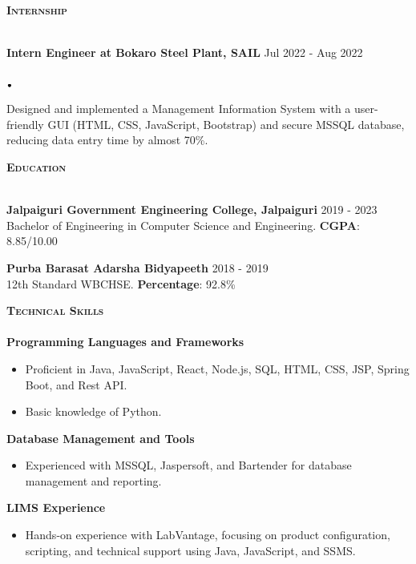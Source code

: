\documentclass[11pt]{article}
\newcommand{\lineunder}{\vspace*{-8pt} \\ \hspace*{-18pt} \hrulefill \\}
\newcommand{\header}[1]{{\hspace*{-15pt}\vspace*{6pt} \textsc{#1}} \vspace*{-6pt} \lineunder}
\newcommand{\lbt}{\,\begin{picture}(-1,1)(-1,-3)\circle*{3}\end{picture}\ }
\newenvironment{achievements}{
    \begin{list}{$\lbt$}{
        \topsep 0pt
        \itemsep 0pt
        \addtolength{\leftmargin}{-0.1in}
    }
}
{
    \vspace*{4pt}
    \end{list}
}
\newcommand{\schoolwithcourses}[3]{
 \textbf{#1} \hfill{#2}\\
    #3\\
\vspace*{5pt}
}
\begin{document}
\header{\textbf{Internship}}
\vspace{1mm}
\schoolwithcourses{Intern Engineer at Bokaro Steel Plant, SAIL}{Jul 2022 - Aug 2022}{}

    \begin{achievements}
    \item{Designed and implemented a Management Information System with a user-friendly GUI (HTML, CSS, JavaScript, Bootstrap) and secure MSSQL database, reducing data entry time by almost 70\%.}
    \end{achievements}


\header{\textbf{Education}}
\vspace{1mm}
\schoolwithcourses{Jalpaiguri Government Engineering College, Jalpaiguri}{2019 - 2023}{Bachelor of Engineering in Computer Science and Engineering. \textbf{CGPA}: 8.85/10.00}

\schoolwithcourses{Purba Barasat Adarsha Bidyapeeth}{2018 - 2019}{12th Standard WBCHSE. \textbf{Percentage}: 92.8\%}

\header{\textbf{Technical Skills}}
\vspace{1mm}
\textbf{Programming Languages and Frameworks}
    \begin{itemize}
        \item Proficient in Java, JavaScript, React, Node.js, SQL, HTML, CSS, JSP, Spring Boot, and Rest API.
        \item Basic knowledge of Python.
    \end{itemize}

\textbf{Database Management and Tools}
    \begin{itemize}
        \item Experienced with MSSQL, Jaspersoft, and Bartender for database management and reporting.
    \end{itemize}

\textbf{LIMS Experience}
    \begin{itemize}
        \item Hands-on experience with LabVantage, focusing on product configuration, scripting, and technical support using Java, JavaScript, and SSMS.
    \end{itemize}
\end{document}
